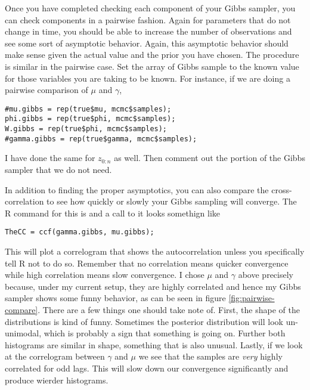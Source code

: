\documentclass{article}
\begin{document}
Once you have completed checking each component of your Gibbs sampler, you can check components in a pairwise fashion.  Again for parameters that do not change in time, you should be able to increase the number of observations and see some sort of asymptotic behavior.  Again, this asymptotic behavior should make sense given the actual value and the prior you have chosen.  The procedure is similar in the pairwise case.  Set the array of Gibbs sample to the known value for those variables you are taking to be known.  For instance, if we are doing a pairwise comparison of $\mu$ and $\gamma$,
\begin{verbatim}
#mu.gibbs = rep(true$mu, mcmc$samples);
phi.gibbs = rep(true$phi, mcmc$samples);
W.gibbs = rep(true$phi, mcmc$samples);
#gamma.gibbs = rep(true$gamma, mcmc$samples);
\end{verbatim}
I have done the same for $z_{0:n}$ as well.
Then comment out the portion of the Gibbs sampler that we do not need.
\begin{comment}
\begin{verbatim}
  # Sample phi | e.e.
#  phi.gibbs[i] = phi.cond.post(x.data, W.gibbs[i-1], ...
  # Sample W | e.e.
#  W.gibbs[i] = W.cond.post(x.data, phi.gibbs[i], ...
  # Sample mu | e.e.
  mu.gibbs[i] = mu.cond.post(z.gibbs[,i-1], phi.gibbs[i], ...
  # Sample gamma | e.e.
  gamma.gibbs[i] = gamma.cond.post(x.data, W.gibbs[i], ...
  # Sample z | e.e.
#  z.gibbs[,i] = z.cond.post(y.data, mu.gibbs[i], m.nu, V, ... 
\end{verbatim}
\end{comment}
In addition to finding the proper asymptotics, you can also compare the cross-correlation to see how quickly or slowly your Gibbs sampling will converge.  The R command for this is  and a call to it looks somethign like
\begin{verbatim}
TheCC = ccf(gamma.gibbs, mu.gibbs);
\end{verbatim}
This will plot a correlogram that shows the autocorrelation unless you specifically tell R not to do so.
Remember that no correlation means quicker convergence while high correlation means slow convergence.  I chose $\mu$ and $\gamma$ above precisely because, under my current setup, they are highly correlated and hence my Gibbs sampler shows some funny behavior, as can be seen in figure \ref{fig:pairwise-compare}.  There are a few things one should take note of.  First, the shape of the distributions is kind of funny.  Sometimes the posterior distribution will look un-unimodal, which is probably a sign that something is going on.  Further both histograms are similar in shape, something that is also unusual.  Lastly, if we look at the correlogram between $\gamma$ and $\mu$ we see that the samples are \emph{very} highly correlated for odd lags.  This will slow down our convergence significantly and produce wierder histograms.
\end{document}
